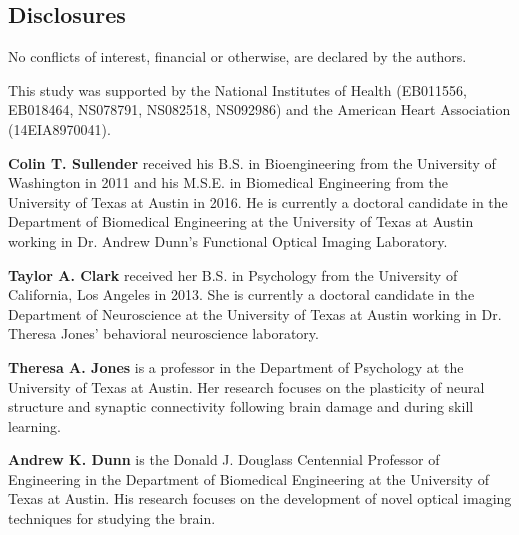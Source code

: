 \documentclass[12pt]{spieman}  %
\begin{document}
\begin{spacing}{2}
\subsection*{Disclosures}
No conflicts of interest, financial or otherwise, are declared by the authors.

\acknowledgments
This study was supported by the National Institutes of Health (EB011556, EB018464, NS078791, NS082518, NS092986) and the American Heart Association (14EIA8970041).





\vspace{1ex}
\vspace{2ex}\noindent\textbf{Colin T. Sullender} received his B.S. in Bioengineering from the University of Washington in 2011 and his M.S.E. in Biomedical Engineering from the University of Texas at Austin in 2016. He is currently a doctoral candidate in the Department of Biomedical Engineering at the University of Texas at Austin working in Dr. Andrew Dunn's Functional Optical Imaging Laboratory.

\vspace{2ex}\noindent\textbf{Taylor A. Clark} received her B.S. in Psychology from the University of California, Los Angeles in 2013. She is currently a doctoral candidate in the Department of Neuroscience at the University of Texas at Austin working in Dr. Theresa Jones' behavioral neuroscience laboratory.

\vspace{2ex}\noindent\textbf{Theresa A. Jones} is a professor in the Department of Psychology at the University of Texas at Austin. Her research focuses on the plasticity of neural structure and synaptic connectivity following brain damage and during skill learning.

\vspace{2ex}\noindent\textbf{Andrew K. Dunn} is the Donald J. Douglass Centennial Professor of Engineering in the Department of Biomedical Engineering at the University of Texas at Austin. His research focuses on the development of novel optical imaging techniques for studying the brain.


\end{spacing}
\end{document}
